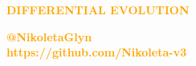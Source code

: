 \documentclass{beamer}
\begin{document}
\begin{frame}
    \begin{center}
    \Large{
    \textbf{\textcolor{orange}{DIFFERENTIAL EVOLUTION}}}
    \end{center}
\end{frame}

\begin{frame}
    \begin{center}
    
    \end{center}
\end{frame}

\begin{frame}
\centering
    \large \textbf{\textcolor{orange}{{@NikoletaGlyn}}}\\
    \large \textbf{\textcolor{orange}{{https://github.com/Nikoleta-v3}}}\\
\end{frame}
\end{document}
